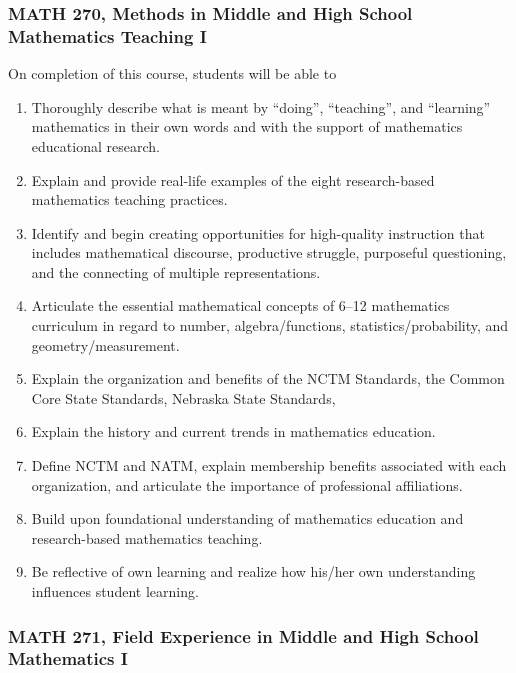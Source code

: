 \documentclass[10pt]{article}
\newenvironment{alphalist}{
\begin{enumerate}[label=(\arabic*),widest=107 ,leftmargin=25pt, itemsep=0pt]}
{\end{enumerate}}
\begin{document}
\subsubsection*{MATH 270, Methods in Middle and High School Mathematics Teaching I}

On completion of this course, students will be able to
\begin{alphalist}
\item Thoroughly describe what is meant by “doing”, “teaching”, and “learning” mathematics in their own words and with the support of mathematics educational research.
\item Explain and provide real-life examples of the eight research-based mathematics teaching practices.
\item Identify and begin creating opportunities for high-quality instruction that includes mathematical discourse, productive struggle, purposeful questioning, and the connecting of multiple representations.
\item Articulate the essential mathematical concepts of 6--12 mathematics curriculum in regard to number, algebra/functions, statistics/probability, and geometry/measurement.
\item Explain the organization and benefits of the NCTM Standards, the Common Core State Standards, Nebraska State Standards,
\item Explain the history and current trends in mathematics education.
\item Define NCTM and NATM, explain membership benefits associated with each organization, and articulate the importance of professional affiliations.
\item Build upon foundational understanding of mathematics education and research-based mathematics teaching.
\item Be reflective of own learning and realize how his/her own understanding influences student learning.
\end{alphalist}

\subsubsection*{MATH 271, Field Experience in Middle and High School Mathematics I}
\end{document}
